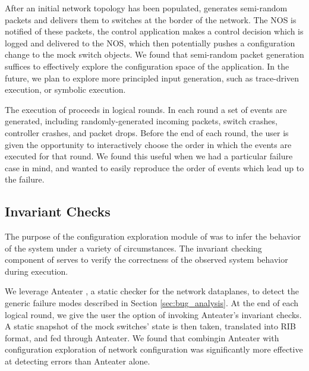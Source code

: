 After an initial network topology has been populated, \projectname{}
generates semi-random packets and delivers them to switches at the border of
the network. The NOS is notified of these packets, the control application
makes a control decision which is logged and delivered to the NOS, which then
potentially pushes a configuration change to the mock switch objects. We found
that semi-random packet generation suffices to effectively explore the
configuration space of the application. In the future, we plan to explore more
principled input generation, such as trace-driven execution, or symbolic
execution. 

The execution of \projectname{} proceeds in logical rounds. In each round 
a set of events are generated, including randomly-generated incoming packets,
switch crashes, controller crashes, and packet drops. Before the end of 
each round, the user is given the opportunity to interactively choose the order
in which the events are executed for that round. We found this useful when we
had a particular failure case in mind, and wanted to easily reproduce the
order of events which lead up to the failure.


\subsection{Invariant Checks}
\label{sec:invariant_checks}

The purpose of the configuration exploration module of \projectname{} was to
infer the behavior of the system under a variety of circumstances. The invariant
checking component of \projectname{} serves to verify the correctness of the
observed system behavior during execution.

We leverage Anteater \cite{anteater}, a static checker for the network
dataplanes, to detect the generic failure modes described in Section \ref{sec:bug_analysis}.
At the end of each logical round, we give the user the option of invoking
Anteater's invariant checks. A static snapshot of the mock switches' state is
then taken, translated into RIB format, and fed through Anteater. We found
that combingin Anteater with configuration exploration of network
configuration was significantly more effective at detecting errors than Anteater alone.

